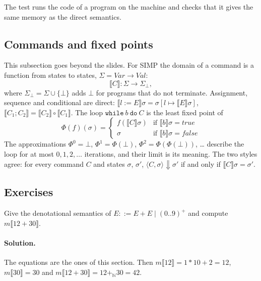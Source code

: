 The test runs the code of a program on the machine and checks that it gives
the same memory as the direct semantics.

\subsection{Commands and fixed points}

This subsection goes beyond the slides. For SIMP the domain of a command is
a function from states to states, $\Sigma = \mathit{Var} \to \mathit{Val}$:
\[
\llbracket C \rrbracket : \Sigma \to \Sigma_\bot,
\]
where $\Sigma_\bot = \Sigma \cup \{\bot\}$ adds $\bot$ for programs that do not terminate.
Assignment, sequence and conditional are direct:
$\llbracket l := E \rrbracket\sigma = \sigma[l \mapsto \llbracket E \rrbracket\sigma]$,
$\llbracket C_1 ; C_2 \rrbracket = \llbracket C_2 \rrbracket \circ \llbracket C_1 \rrbracket$. The loop
$\mathtt{while}\ b\ \mathtt{do}\ C$ is the least fixed point of
\[
\Phi(f)(\sigma) =
\begin{cases}
f(\llbracket C \rrbracket\sigma) & \text{if } \llbracket b \rrbracket\sigma = \mathit{true} \\
\sigma & \text{if } \llbracket b \rrbracket\sigma = \mathit{false}
\end{cases}
\]
The approximations $\Phi^0 = \bot$, $\Phi^1 = \Phi(\bot)$, $\Phi^2 = \Phi(\Phi(\bot))$, \dots{}
describe the loop for at most $0, 1, 2, \dots$ iterations, and their limit is
its meaning. The two styles agree: for every command $C$ and states $\sigma$,
$\sigma'$, $\langle C, \sigma \rangle \Downarrow \sigma'$ if and only if $\llbracket C \rrbracket\sigma = \sigma'$.

\subsection{Exercises}

\begin{exercise}
Give the denotational semantics of $E ::= E + E \mid (0..9)^+$ and compute
$m\llbracket 12 + 30 \rrbracket$.
\end{exercise}

\paragraph{Solution.} The equations are the ones of this section. Then
$m\llbracket 12 \rrbracket = 1 * 10 + 2 = 12$, $m\llbracket 30 \rrbracket = 30$ and
$m\llbracket 12 + 30 \rrbracket = 12 +_{\mathbb{N}} 30 = 42$.

